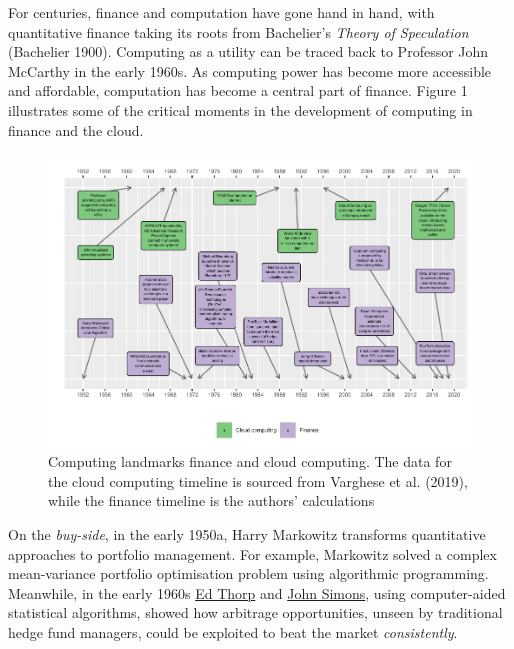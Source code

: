 \documentclass{article}
\begin{document}
For centuries, finance and computation have gone hand in hand, with
quantitative finance taking its roots from Bachelier's \emph{Theory of
Speculation} (Bachelier 1900). Computing as a utility can be traced back
to Professor John McCarthy in the early 1960s. As computing power has
become more accessible and affordable, computation has become a central
part of finance. Figure 1 illustrates some of the critical moments in
the development of computing in finance and the cloud.

\begin{figure}

{\centering \includegraphics[width=1\linewidth]{qrap_paper_files/figure-latex/timeline-1} 

}

\caption{ Computing landmarks finance and cloud computing.   The data for the cloud computing timeline is sourced from Varghese et al. (2019), while the finance timeline is the authors' calculations}\label{fig:timeline}
\end{figure}

On the \emph{buy-side}, in the early 1950a, Harry Markowitz transforms
quantitative approaches to portfolio management. For example, Markowitz
solved a complex mean-variance portfolio optimisation problem using
algorithmic programming. Meanwhile, in the early 1960s
\href{https://en.wikipedia.org/wiki/Edward_O._Thorp}{Ed Thorp} and
\href{https://en.wikipedia.org/wiki/Jim_Simons_(mathematician)}{John
Simons}, using computer-aided statistical algorithms, showed how
arbitrage opportunities, unseen by traditional hedge fund managers,
could be exploited to beat the market \emph{consistently}.
\end{document}
